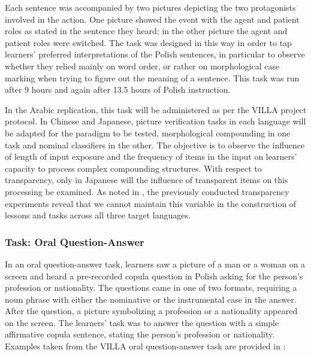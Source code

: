 \documentclass[output=paper,colorlinks,citecolor=brown,modfonts,nonflat]{../langscibook}
\begin{document}
Each sentence was accompanied by two pictures depicting the two protagonists involved in the action. One picture showed the event with the agent and patient roles as stated in the sentence they heard; in the other picture the agent and patient roles were switched. The task was designed in this way in order to tap learners’ preferred interpretations of the Polish sentences, in particular to observe whether they relied mainly on word order, or rather on morphological case marking when trying to figure out the meaning of a sentence. This task was run after 9 hours and again after 13.5 hours of Polish instruction.

In the Arabic replication, this task will be administered as per the VILLA project protocol. In Chinese and Japanese, picture verification tasks in each language will be adapted for the paradigm to be tested, morphological compounding in one task and nominal classifiers in the other. The objective is to observe the influence of length of input exposure and the frequency of items in the input on learners’ capacity to process complex compounding structures. With respect to transparency, only in Japanese will the influence of transparent items on this processing be examined. As noted in , the previously conducted transparency experiments reveal that we cannot maintain this variable in the construction of lessons and tasks across all three target languages.

\subsubsection{Task: Oral Question-Answer}

In an oral question-answer task, learners saw a picture of a man or a woman on a screen and heard a pre-recorded copula question in Polish asking for the person’s profession or nationality. The questions came in one of two formats, requiring a noun phrase with either the nominative or the instrumental case in the answer. After the question, a picture symbolizing a profession or a nationality appeared on the screen. The learners’ task was to answer the question with a simple affirmative copula sentence, stating the person’s profession or nationality. Examples taken from the VILLA oral question-answer task are provided in :

\end{document}

